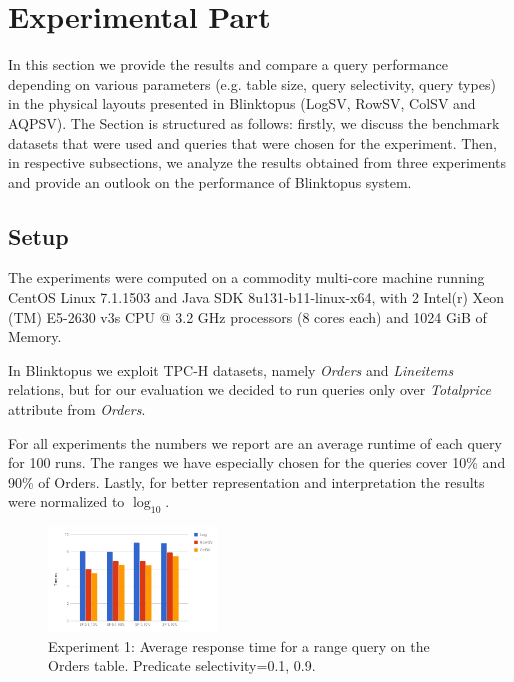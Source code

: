 \documentclass[10pt, conference, compsocconf]{IEEEtran}
\begin{document}
\section{Experimental Part}
In this section we provide the results and compare a query performance depending on various parameters (e.g. table size, query selectivity, query types) in the physical layouts presented in Blinktopus (LogSV, RowSV, ColSV and AQPSV). The Section is structured as follows: firstly, we discuss the benchmark datasets that were used and queries that were chosen for the experiment. Then, in respective subsections, we analyze the results obtained from three experiments and provide an outlook on the performance of Blinktopus system.

\label{subsec:Setup}
\subsection{Setup}

The experiments were computed on a commodity multi-core machine running CentOS Linux 7.1.1503 and Java SDK 8u131-b11-linux-x64, with 2 Intel(r) Xeon (TM) E5-2630 v3s CPU @ 3.2 GHz processors (8 cores each) and 1024 GiB of Memory. 

In Blinktopus we exploit TPC-H datasets, namely \textit{Orders} and \textit{Lineitems} relations, but for our evaluation we decided to run queries only over \textit{Totalprice} attribute from \textit{Orders}.

For all experiments the numbers we report are an average runtime of each query for 100 runs. The ranges we have especially chosen for the queries cover 10\% and 90\% of Orders. Lastly, for better representation and interpretation the results were normalized to $\log_{10}$.

\label{fig:exp1}
\begin{figure} \includegraphics[width=0.4\textwidth, center]{img/exp1.png} 
\caption{Experiment 1: Average response time for a range query on the Orders table. Predicate selectivity=0.1, 0.9.}
\end{figure}
\end{document}
